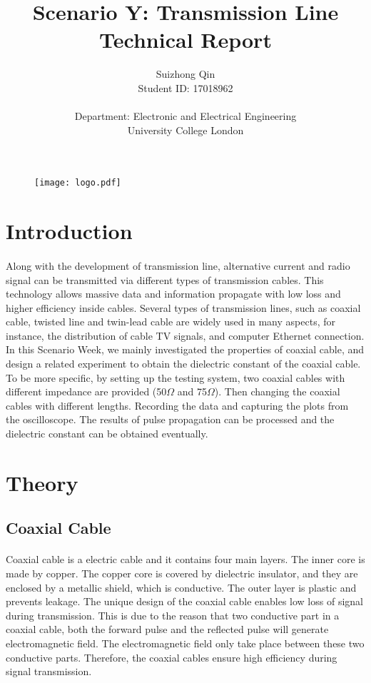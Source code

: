 \documentclass[12pt]{article}
\title{Scenario Y: Transmission Line \\ Technical Report}
\author{Suizhong Qin \\Student ID: 17018962 \\\\ Department: Electronic and Electrical Engineering \\ University College London}
\begin{document}
    \begin{figure}[t] %
    \centering
    \texttt{[image: logo.pdf]}
    \end{figure}
    \maketitle
    \thispagestyle{empty}

    \newpage
    \tableofcontents
    \thispagestyle{empty}
    \setcounter{page}{0}
    
    \newpage
    \pagestyle{plain}
    \section{Introduction}
    \paragraph{}
    Along with the development of transmission line, alternative current and radio signal can be transmitted via different types of transmission cables. This technology allows massive data and information propagate with low loss and higher efficiency inside cables. Several types of transmission lines, such as coaxial cable, twisted line and twin-lead cable are widely used in many aspects, for instance, the distribution of cable TV signals, and computer Ethernet connection\cite{1}.  In this Scenario Week, we mainly investigated the properties of coaxial cable, and design a related experiment to obtain the dielectric constant of the coaxial cable. To be more specific, by setting up the testing system, two coaxial cables with different impedance are provided (50$\Omega$ and 75$\Omega$). Then changing the coaxial cables with different lengths. Recording the data and capturing the plots from the oscilloscope. The results of pulse propagation can be processed and the dielectric constant can be obtained eventually.
    

    \section{Theory}
    \subsection{Coaxial Cable}
    \paragraph{}
    Coaxial cable is a electric cable and it contains four main layers. The inner core is made by copper. The copper core is covered by dielectric insulator, and they are enclosed by a metallic shield, which is conductive. The outer layer is plastic and prevents leakage\cite{2}. The unique design of the coaxial cable enables low loss of signal during transmission. This is due to the reason that two conductive part in a coaxial cable, both the forward pulse and the reflected pulse will generate electromagnetic field. The electromagnetic field only take place between these two conductive parts. Therefore, the coaxial cables ensure high efficiency during signal transmission.
    
\end{document}
